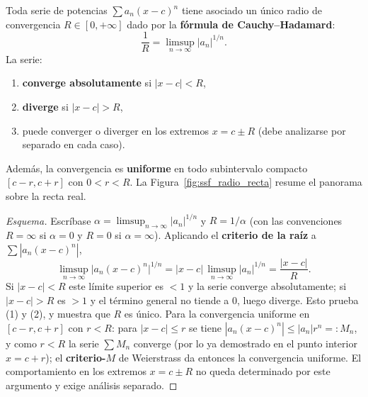 \begin{theorem}
\label{thm:radio_convergencia}
Toda serie de potencias $\sum a_n(x-c)^n$ tiene asociado un único
radio de convergencia $R \in [0,+\infty]$ dado por la
\textbf{fórmula de Cauchy--Hadamard}:
\[
    \frac{1}{R} = \limsup_{n\to\infty} |a_n|^{1/n}.
\]
La serie:
\begin{enumerate}
    \item \textbf{converge absolutamente} si $|x-c| < R$,
    \item \textbf{diverge} si $|x-c| > R$,
    \item puede converger o diverger en los extremos $x = c\pm R$
          (debe analizarse por separado en cada caso).
\end{enumerate}
Además, la convergencia es \textbf{uniforme} en todo subintervalo
compacto $[c-r, c+r]$ con $0 < r < R$. La
Figura~\ref{fig:ssf_radio_recta} resume el panorama sobre la recta real.
\end{theorem}

\begin{proof}[Esquema]
Escríbase $\alpha=\limsup_{n\to\infty}|a_n|^{1/n}$ y $R=1/\alpha$ (con las
convenciones $R=\infty$ si $\alpha=0$ y $R=0$ si $\alpha=\infty$). Aplicando el
\textbf{criterio de la raíz} a $\sum|a_n(x-c)^n|$,
\[
  \limsup_{n\to\infty}\bigl|a_n(x-c)^n\bigr|^{1/n}
  =|x-c|\,\limsup_{n\to\infty}|a_n|^{1/n}=\frac{|x-c|}{R}.
\]
Si $|x-c|<R$ este límite superior es $<1$ y la serie converge absolutamente; si
$|x-c|>R$ es $>1$ y el término general no tiende a $0$, luego diverge. Esto
prueba (1) y (2), y muestra que $R$ es único. Para la convergencia uniforme en
$[c-r,c+r]$ con $r<R$: para $|x-c|\leq r$ se tiene
$|a_n(x-c)^n|\leq|a_n|r^n=:M_n$, y como $r<R$ la serie $\sum M_n$ converge (por
lo ya demostrado en el punto interior $x=c+r$); el \textbf{criterio-$M$} de
Weierstrass da entonces la convergencia uniforme. El comportamiento en los
extremos $x=c\pm R$ no queda determinado por este argumento y exige análisis
separado.
\end{proof}

